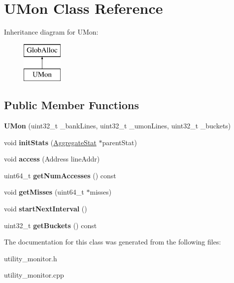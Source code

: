 \hypertarget{classUMon}{\section{U\-Mon Class Reference}
\label{classUMon}
}
Inheritance diagram for U\-Mon\-:\begin{figure}[H]
\begin{center}
\leavevmode
\includegraphics[height=2.000000cm]{classUMon}
\end{center}
\end{figure}
\subsection*{Public Member Functions}
\begin{DoxyCompactItemize}
\item 
\hypertarget{classUMon_a3685f727993e9abd378bf488472f0d8c}{{\bfseries U\-Mon} (uint32\-\_\-t \-\_\-bank\-Lines, uint32\-\_\-t \-\_\-umon\-Lines, uint32\-\_\-t \-\_\-buckets)}\label{classUMon_a3685f727993e9abd378bf488472f0d8c}

\item 
\hypertarget{classUMon_a5c6a57fbfe2f8cd2d1efd5559ab93abe}{void {\bfseries init\-Stats} (\hyperlink{classAggregateStat}{Aggregate\-Stat} $\ast$parent\-Stat)}\label{classUMon_a5c6a57fbfe2f8cd2d1efd5559ab93abe}

\item 
\hypertarget{classUMon_adf8c7528fab287f2cbf2bfeaa2dcb1c0}{void {\bfseries access} (Address line\-Addr)}\label{classUMon_adf8c7528fab287f2cbf2bfeaa2dcb1c0}

\item 
\hypertarget{classUMon_a0f90608dbef871ecc9ebeda383ab276f}{uint64\-\_\-t {\bfseries get\-Num\-Accesses} () const }\label{classUMon_a0f90608dbef871ecc9ebeda383ab276f}

\item 
\hypertarget{classUMon_a3692df466d03a027aeeb6d8b4d21d53c}{void {\bfseries get\-Misses} (uint64\-\_\-t $\ast$misses)}\label{classUMon_a3692df466d03a027aeeb6d8b4d21d53c}

\item 
\hypertarget{classUMon_ac01d1d8753cf7cebbe4b35648faa4c3c}{void {\bfseries start\-Next\-Interval} ()}\label{classUMon_ac01d1d8753cf7cebbe4b35648faa4c3c}

\item 
\hypertarget{classUMon_a9836e828ed4cd975429234b881592876}{uint32\-\_\-t {\bfseries get\-Buckets} () const }\label{classUMon_a9836e828ed4cd975429234b881592876}

\end{DoxyCompactItemize}


The documentation for this class was generated from the following files\-:\begin{DoxyCompactItemize}
\item 
utility\-\_\-monitor.\-h\item 
utility\-\_\-monitor.\-cpp\end{DoxyCompactItemize}
